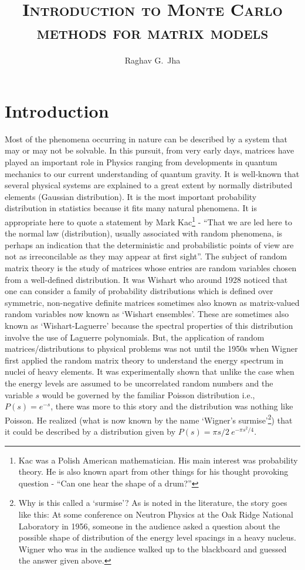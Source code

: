 \documentclass[11pt]{article}
\title{\textsc{Introduction to Monte Carlo methods for matrix models}}
\author[a]{Raghav G.~Jha}
\affiliation{Perimeter Institute for Theoretical Physics, Waterloo, Ontario N2L 2Y5, Canada}
\begin{document}
\date{}
\maketitle

\section{Introduction}

Most of the phenomena occurring in nature can be described by a system that may or may not be solvable. 
In this pursuit, from very early days, matrices have played an important role in Physics ranging from 
developments in quantum mechanics to our current understanding of quantum gravity. 
It is well-known that several physical systems are explained to a great extent 
by normally distributed elements (Gaussian distribution). It is the most important probability 
distribution in statistics because it fits many natural phenomena. It is appropriate here to quote a statement by Mark Kac\footnote{Kac was a Polish American mathematician. His main interest was probability theory. He is also known apart from other things for his thought provoking question - ``Can one hear 
the shape of a drum?''} - ``That we are led here to the normal law (distribution), usually associated with random phenomena, is perhaps
an indication that the deterministic and probabilistic points of view are not as irreconcilable as they may appear at first sight''.
The subject of random matrix theory is the study of matrices whose entries are random 
variables chosen from a well-defined distribution. It was Wishart who 
around 1928 noticed that one can consider a family of 
probability distributions which is defined over symmetric, non-negative definite 
matrices sometimes also known as matrix-valued random variables 
now known as `Wishart ensembles'. These are sometimes also known 
as `Wishart-Laguerre' because the spectral properties of this distribution 
involve the use of Laguerre polynomials. But, the application of random matrices/distributions
to physical problems was not until the 1950s
when Wigner first applied the random matrix theory 
to understand the energy spectrum in nuclei of heavy elements. It was experimentally 
shown that unlike the case when the energy levels are assumed to be uncorrelated
random numbers and the variable $s$ would be governed by the familiar Poisson distribution 
i.e., $P(s) = e^{-s}$, there was more to this story and the distribution was nothing like Poisson. 
He realized (what is now known by the name `Wigner's surmise'\footnote{Why is this called a `surmise'? 
As is noted in the literature, the story goes like this: At some conference on Neutron Physics at the Oak 
Ridge National Laboratory in 1956, someone in the audience asked a question about the possible shape 
of distribution of the energy level spacings in a heavy nucleus. Wigner who was in the audience 
walked up to the blackboard and guessed the answer given above.}) that it could be described by a distribution given by $P(s) = \pi s/2~e^{-\pi s^2/4}$. 
\end{document}
